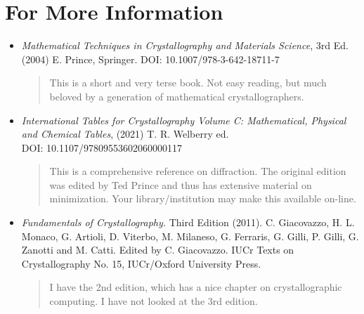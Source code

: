 \section{For More Information}

\begin{itemize}
\item 
\textit{Mathematical Techniques in Crystallography and Materials Science}, 3rd Ed. (2004) E. Prince, Springer. DOI: 10.1007/978-3-642-18711-7
\begin{quote}
This is a short and very terse book. Not easy reading, but much beloved by a generation of mathematical crystallographers. 
\end{quote}

\item\textit{International Tables for Crystallography
Volume C: Mathematical, Physical and Chemical Tables}, (2021) T. R. Welberry ed.\\ 
DOI: 10.1107/97809553602060000117
\begin{quote}
This is a comprehensive reference on diffraction. The original edition was edited by Ted Prince and thus has extensive material on minimization.  Your library/institution may make this available on-line. 
\end{quote}

\item 
\textit{Fundamentals of Crystallography.} Third Edition (2011). C. Giacovazzo, H. L. Monaco, G. Artioli, D. Viterbo, M. Milaneso, G. Ferraris, G. Gilli, P. Gilli, G. Zanotti and M. Catti. Edited by C. Giacovazzo. IUCr Texts on Crystallography No. 15, IUCr/Oxford University Press.
\begin{quote}
I have the 2nd edition, which has a nice chapter on crystallographic computing. I have not looked at the 3rd edition. 
\end{quote}

\end{itemize}
